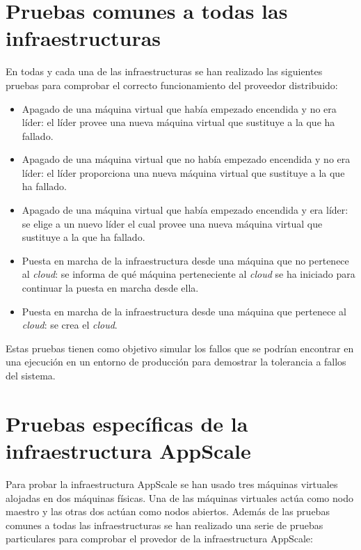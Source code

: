 \section{Pruebas comunes a todas las infraestructuras}

En todas y cada una de las infraestructuras se han realizado las siguientes pruebas para comprobar el correcto funcionamiento del proveedor distribuido:

\begin{itemize}
\item Apagado de una máquina virtual que había empezado encendida y no era líder: el líder provee una nueva máquina virtual que sustituye a la que ha fallado.
\item Apagado de una máquina virtual que no había empezado encendida y no era líder: el líder proporciona una nueva máquina virtual que sustituye a la que ha fallado.
\item Apagado de una máquina virtual que había empezado encendida y era líder: se elige a un nuevo líder el cual provee una nueva máquina virtual que sustituye a la que ha fallado.
\item Puesta en marcha de la infraestructura desde una máquina que no pertenece al \emph{cloud}: se informa de qué máquina perteneciente al \emph{cloud} se ha iniciado para continuar la puesta en marcha desde ella.
\item Puesta en marcha de la infraestructura desde una máquina que pertenece al \emph{cloud}: se crea el \emph{cloud}.
\end{itemize}

Estas pruebas tienen como objetivo simular los fallos que se podrían encontrar en una ejecución en un entorno de producción para demostrar la tolerancia a fallos del sistema.


\section{Pruebas específicas de la infraestructura AppScale}

Para probar la infraestructura AppScale se han usado tres máquinas virtuales alojadas en dos máquinas físicas. Una de las máquinas virtuales actúa como nodo maestro y las otras dos actúan como nodos abiertos. Además de las pruebas comunes a todas las infraestructuras se han realizado una serie de pruebas particulares para comprobar el provedor de la infraestructura AppScale:

